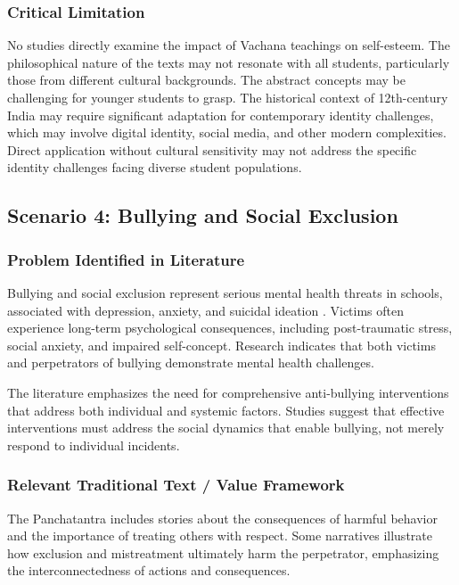 \documentclass[12pt,a4paper,twocolumn]{article}
\begin{document}
\subsubsection{Critical Limitation}

No studies directly examine the impact of Vachana teachings on self-esteem. The philosophical nature of the texts may not resonate with all students, particularly those from different cultural backgrounds. The abstract concepts may be challenging for younger students to grasp. The historical context of 12th-century India may require significant adaptation for contemporary identity challenges, which may involve digital identity, social media, and other modern complexities. Direct application without cultural sensitivity may not address the specific identity challenges facing diverse student populations.

\subsection{Scenario 4: Bullying and Social Exclusion}

\subsubsection{Problem Identified in Literature}

Bullying and social exclusion represent serious mental health threats in schools, associated with depression, anxiety, and suicidal ideation \citep{Kumaran2019}. Victims often experience long-term psychological consequences, including post-traumatic stress, social anxiety, and impaired self-concept. Research indicates that both victims and perpetrators of bullying demonstrate mental health challenges.

The literature emphasizes the need for comprehensive anti-bullying interventions that address both individual and systemic factors. Studies suggest that effective interventions must address the social dynamics that enable bullying, not merely respond to individual incidents.

\subsubsection{Relevant Traditional Text / Value Framework}

The Panchatantra includes stories about the consequences of harmful behavior and the importance of treating others with respect. Some narratives illustrate how exclusion and mistreatment ultimately harm the perpetrator, emphasizing the interconnectedness of actions and consequences.
\end{document}
